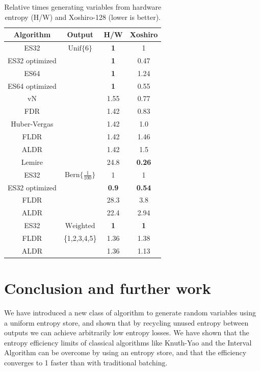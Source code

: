 \documentclass[lettersize,journal]{IEEEtran}
\newcommand{\unif}[1]{\mathrm{Unif}\{#1\}}
\newcommand{\bern}[1]{\mathrm{Bern}\{#1\}}
\begin{document}
\begin{table}[h!]
\centering
\begin{tabular}{|c|c|c|c|}
\hline
Algorithm & Output & H/W & Xoshiro \\
\hline
ES32                  & $\unif{6}$ & \textbf{1} & 1 \\
ES32 optimized        &  & \textbf{1} & 0.47 \\
ES64                  & & \textbf{1} & 1.24 \\
ES64 optimized        &  & \textbf{1} & 0.55 \\
vN \cite{neumann51}     &  & 1.55 & 0.77 \\
FDR \cite{lumbroso2013optimal} &  & 1.42 & 0.83 \\
Huber-Vergas \cite{huber2024optimalrollingfairdice} &  & 1.42 & 1.0 \\
FLDR \cite{saad2020fldr} &  & 1.42 & 1.46 \\
ALDR \cite{saad2025} &  & 1.42 & 1.5 \\
Lemire \cite{lemire2019fast} & & 24.8 & \textbf{0.26} \\
\hline

ES32                  & $\bern{\frac{1}{100}}$ & 1 & 1 \\
ES32 optimized        &  & \textbf{0.9} & \textbf{0.54} \\
FLDR                  &  & 28.3 & 3.8 \\
ALDR                  &  & 22.4 & 2.94 \\

\hline

ES32                  & $\mathrm{Weighted}$ & \textbf{1} & \textbf{1} \\
FLDR                  & \{1,2,3,4,5\} & 1.36 & 1.38 \\
ALDR                  & & 1.36 & 1.13 \\

\hline

\end{tabular}
\caption{Relative times generating variables from hardware entropy (H/W) and Xoshiro-128 \cite{blackman21} (lower is better).}
    \label{tab:speed}
\end{table}



\section{Conclusion and further work}

We have introduced a new class of algorithm to generate random variables using a uniform entropy store, and shown that by recycling unused entropy between outputs we can achieve arbitrarily low entropy losses. 
We have shown that the entropy efficiency limits of classical algorithms like Knuth-Yao \cite{knuth1976complexity} and the Interval Algorithm \cite{han97} can be overcome by using an entropy store, and that the efficiency converges to 1 faster than with traditional batching. 
\end{document}
